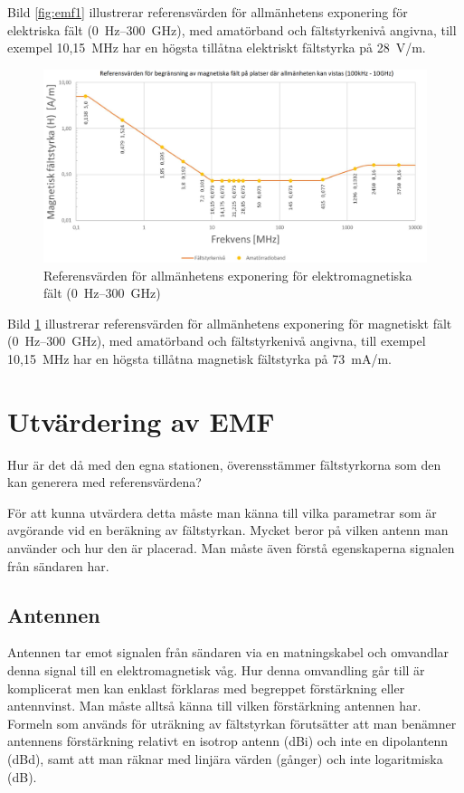 Bild \ref{fig:emf1} illustrerar referensvärden för allmänhetens
exponering för elektriska fält (0~Hz--300~GHz), med amatörband
och fältstyrkenivå angivna, till exempel 10,15~MHz har en högsta tillåtna
elektriskt fältstyrka på 28~V/m.

\begin{figure}[ht]
\begin{center}
\includegraphics[width=14cm]{images/emfbild-001}
\caption{Referensvärden för allmänhetens exponering för elektromagnetiska fält (0~Hz--300~GHz)}
\label{fig:emf2}
\end{center}
\end{figure}

Bild \ref{fig:emf2} illustrerar referensvärden för allmänhetens
exponering för magnetiskt fält (0~Hz--300~GHz), med amatörband
och fältstyrkenivå angivna, till exempel 10,15~MHz har en högsta tillåtna
magnetisk fältstyrka på 73~mA/m.

\section{Utvärdering av EMF}

Hur är det då med den egna stationen, överensstämmer fältstyrkorna som
den kan generera med referensvärdena?

För att kunna utvärdera detta måste man känna till vilka parametrar
som är avgörande vid en beräkning av fältstyrkan.
Mycket beror på vilken antenn man använder och hur den är placerad.
Man måste även förstå egenskaperna signalen från sändaren har.

\subsection{Antennen}

Antennen tar emot signalen från sändaren via en matningskabel och
omvandlar denna signal till en elektromagnetisk våg.
Hur denna omvandling går till är komplicerat men kan enklast förklaras med
begreppet förstärkning eller antennvinst.
Man måste alltså känna till vilken förstärkning antennen har.
Formeln som används för uträkning av fältstyrkan förutsätter att man benämner
antennens förstärkning relativt en isotrop antenn (dBi) och inte en dipolantenn
(dBd), samt att man räknar med linjära värden (gånger) och inte
logaritmiska (dB).

